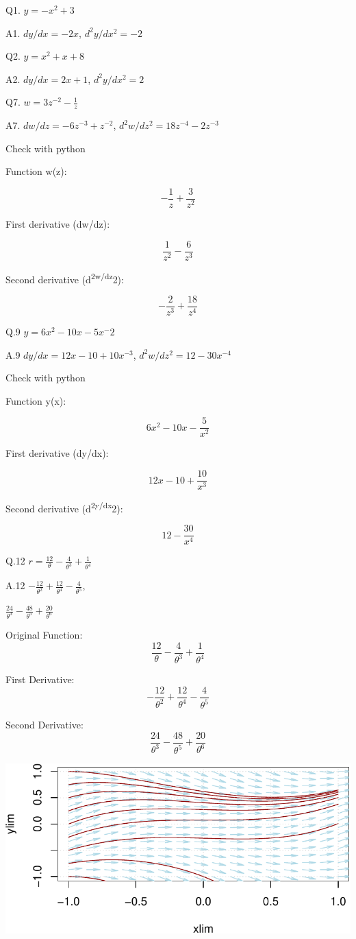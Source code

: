 \documentclass[
  letterpaper,
  DIV=11,
  numbers=noendperiod]{scrartcl}
\begin{document}
Q1. \(y = -x^2 + 3\)

A1. \(dy/dx = -2x\), \(d^2y/dx^2 = -2\)

Q2. \(y = x^2 + x + 8\)

A2. \(dy/dx = 2x + 1\), \(d^2y/dx^2 = 2\)

Q7. \(w = 3z^{-2} - \frac{1}{z}\)

A7. \(dw/dz = -6z^{-3}+z^{-2}\), \(d^2w/dz^2 = 18z^{-4}-2z^{-3}\)

Check with python

Function w(z):

\[- \frac{1}{z} + \frac{3}{z^{2}}\]

First derivative (dw/dz):

\[\frac{1}{z^{2}} - \frac{6}{z^{3}}\]

Second derivative (d\textsuperscript{2w/dz}2):

\[- \frac{2}{z^{3}} + \frac{18}{z^{4}}\]

Q.9 \(y=6x^2-10x-5x^-2\)

A.9 \(dy/dx = 12x - 10 +10x^{-3}\), \(d^2w/dz^2 = 12-30x^{-4}\)

Check with python

Function y(x):

\[6 x^{2} - 10 x - \frac{5}{x^{2}}\]

First derivative (dy/dx):

\[12 x - 10 + \frac{10}{x^{3}}\]

Second derivative (d\textsuperscript{2y/dx}2):

\[12 - \frac{30}{x^{4}}\]

Q.12 \(r = \frac{12}{\theta} - \frac{4}{\theta^3} + \frac{1}{\theta^4}\)

A.12
\(- \frac{12}{\theta^{2}} + \frac{12}{\theta^{4}} - \frac{4}{\theta^{5}}\),

\(\frac{24}{\theta^{3}} - \frac{48}{\theta^{5}} + \frac{20}{\theta^{6}}\)

Original Function:
\[\frac{12}{\theta} - \frac{4}{\theta^{3}} + \frac{1}{\theta^{4}}\]

First Derivative:
\[- \frac{12}{\theta^{2}} + \frac{12}{\theta^{4}} - \frac{4}{\theta^{5}}\]

Second Derivative:
\[\frac{24}{\theta^{3}} - \frac{48}{\theta^{5}} + \frac{20}{\theta^{6}}\]

\includegraphics{index_files/figure-pdf/unnamed-chunk-5-1.pdf}
\end{document}
